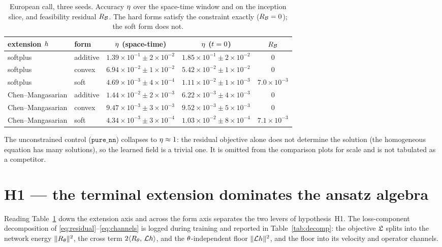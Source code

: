 \documentclass[11pt]{article}
\theoremstyle{plain}
\theoremstyle{definition}
\theoremstyle{remark}
\begin{document}
\begin{table}[htbp]\centering
\caption{European call, three seeds. Accuracy $\eta$ over the space-time
  window and on the inception slice, and feasibility residual $R_{\mathcal{B}}$.
  The hard forms satisfy the constraint exactly ($R_{\mathcal{B}}=0$); the soft
  form does not.}\label{tab:main}
\begin{tabular}{llccc}
\toprule
extension $h$ & form & $\eta$ (space-time) & $\eta$ ($t=0$) & $R_{\mathcal{B}}$\\
\midrule
softplus & additive & $1.39\!\times\!10^{-1}\!\pm\!2\!\times\!10^{-2}$ & $1.85\!\times\!10^{-1}\!\pm\!2\!\times\!10^{-2}$ & $0$\\
softplus & convex   & $6.94\!\times\!10^{-2}\!\pm\!1\!\times\!10^{-2}$ & $5.42\!\times\!10^{-2}\!\pm\!1\!\times\!10^{-2}$ & $0$\\
softplus & soft     & $4.69\!\times\!10^{-3}\!\pm\!4\!\times\!10^{-4}$ & $1.11\!\times\!10^{-2}\!\pm\!1\!\times\!10^{-3}$ & $7.0\!\times\!10^{-3}$\\
\midrule
Chen--Mangasarian & additive & $1.44\!\times\!10^{-2}\!\pm\!2\!\times\!10^{-3}$ & $6.22\!\times\!10^{-3}\!\pm\!4\!\times\!10^{-3}$ & $0$\\
Chen--Mangasarian & convex   & $9.47\!\times\!10^{-3}\!\pm\!3\!\times\!10^{-3}$ & $9.52\!\times\!10^{-3}\!\pm\!5\!\times\!10^{-3}$ & $0$\\
Chen--Mangasarian & soft     & $4.34\!\times\!10^{-3}\!\pm\!3\!\times\!10^{-4}$ & $1.03\!\times\!10^{-2}\!\pm\!8\!\times\!10^{-4}$ & $7.1\!\times\!10^{-3}$\\
\bottomrule
\end{tabular}
\end{table}

The unconstrained control ($\mathtt{pure\_nn}$) collapses to
$\eta\approx1$: the residual objective alone does not determine the solution
(the homogeneous equation has many solutions), so the learned field is a trivial
one. It is omitted from the comparison plots for scale and is not tabulated as a
competitor.

\section{H1 --- the terminal extension dominates the ansatz algebra}\label{sec:h1}

Reading Table~\ref{tab:main} down the extension axis and across the form axis
separates the two levers of hypothesis~H1. The loss-component decomposition of
\eqref{eq:residual}--\eqref{eq:channels} is logged during training and reported in
Table~\ref{tab:decomp}: the objective $\mathfrak{L}$ splits into the network energy
$\lVert R_{\theta}\rVert^{2}$, the cross term
$2\langle R_{\theta},\,\mathcal{L}h\rangle$, and the
$\theta$-independent floor $\lVert\mathcal{L}h\rVert^{2}$, and the
floor into its velocity and operator channels.
\end{document}
